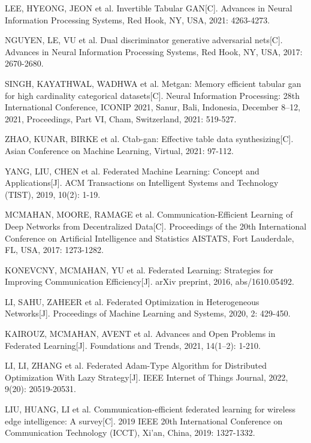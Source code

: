 \begin{thebibliography}{200}
	LEE, HYEONG, JEON et al. Invertible Tabular GAN[C]. Advances in Neural Information Processing Systems, Red Hook, NY, USA, 2021: 4263-4273.

	NGUYEN, LE, VU et al. Dual discriminator generative adversarial nets[C]. Advances in Neural Information Processing Systems, Red Hook, NY, USA, 2017: 2670-2680.

	SINGH, KAYATHWAL, WADHWA et al. Metgan: Memory efficient tabular gan for high cardinality categorical datasets[C]. Neural Information Processing: 28th International Conference, ICONIP 2021, Sanur, Bali, Indonesia, December 8--12, 2021, Proceedings, Part VI, Cham, Switzerland, 2021: 519-527.

	ZHAO, KUNAR, BIRKE et al. Ctab-gan: Effective table data synthesizing[C]. Asian Conference on Machine Learning, Virtual, 2021: 97-112.

	YANG, LIU, CHEN et al. Federated Machine Learning: Concept and Applications[J]. ACM Transactions on Intelligent Systems and Technology (TIST), 2019, 10(2): 1-19.

	MCMAHAN, MOORE, RAMAGE et al. Communication-Efficient Learning of Deep Networks from Decentralized Data[C]. Proceedings of the 20th International Conference on Artificial Intelligence and Statistics AISTATS, Fort Lauderdale, FL, USA, 2017: 1273-1282.

	KONEVCNY, MCMAHAN, YU et al. Federated Learning: Strategies for Improving Communication Efficiency[J]. arXiv preprint, 2016, abs/1610.05492.

	LI, SAHU, ZAHEER et al. Federated Optimization in Heterogeneous Networks[J]. Proceedings of Machine Learning and Systems, 2020, 2: 429-450.

	KAIROUZ, MCMAHAN, AVENT et al. Advances and Open Problems in Federated Learning[J]. Foundations and Trends\textregistered, 2021, 14(1--2): 1-210.

	LI, LI, ZHANG et al. Federated Adam-Type Algorithm for Distributed Optimization With Lazy Strategy[J]. IEEE Internet of Things Journal, 2022, 9(20): 20519-20531.

	LIU, HUANG, LI et al. Communication-efficient federated learning for wireless edge intelligence: A survey[C]. 2019 IEEE 20th International Conference on Communication Technology (ICCT), Xi'an, China, 2019: 1327-1332.


\end{thebibliography}
